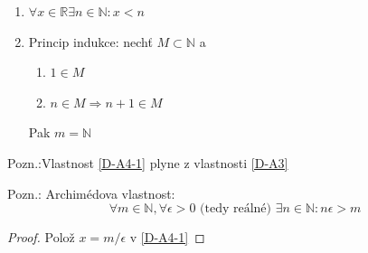 \begin{definitionAi}
	\begin{enumerate}[I]
		\item\label{D-A4-1} $\forall x\in\mathbb{R}\exists n\in\mathbb{N}: x<n$
		\item Princip indukce: nechť $M\subset\mathbb{N}$ a
		\begin{enumerate}
			\item $1\in M$
			\item $n\in M \Rightarrow n+1\in M$
		\end{enumerate}
		Pak $m=\mathbb{N}$
	\end{enumerate}
\end{definitionAi}

Pozn.:Vlastnost \ref{D-A4-1} plyne z vlastnosti \ref{D-A3}

Pozn.: Archimédova vlastnost:
\begin{equation}
	\forall m\in\mathbb{N}, \forall \epsilon>0 \text{ (tedy reálné) }\exists n\in\mathbb{N}:n\epsilon>m
\end{equation}
\begin{proof}
	Polož $x=m/\epsilon$ v \ref{D-A4-1}
\end{proof}

